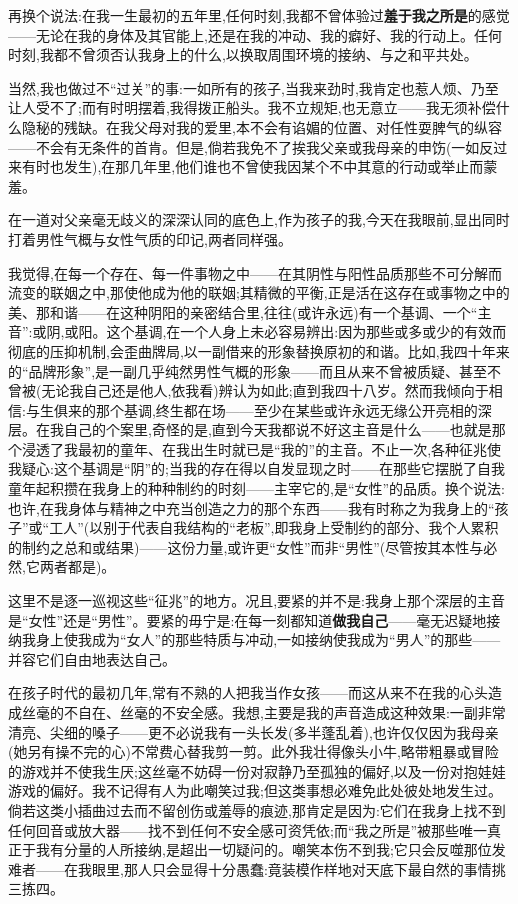 再换个说法:在我一生最初的五年里,任何时刻,我都不曾体验过\textbf{羞于我之所是}的感觉——无论在我的身体及其官能上,还是在我的冲动、我的癖好、我的行动上。任何时刻,我都不曾须否认我身上的什么,以换取周围环境的接纳、与之和平共处。

当然,我也做过不“过关”的事:一如所有的孩子,当我来劲时,我肯定也惹人烦、乃至让人受不了;而有时明摆着,我得拨正船头。我不立规矩,也无意立——我无须补偿什么隐秘的残缺。在我父母对我的爱里,本不会有谄媚的位置、对任性耍脾气的纵容——不会有无条件的首肯。但是,倘若我免不了挨我父亲或我母亲的申饬(一如反过来有时也发生),在那几年里,他们谁也不曾使我因某个不中其意的行动或举止而蒙羞。

在一道对父亲毫无歧义的深深认同的底色上,作为孩子的我,今天在我眼前,显出同时打着男性气概与女性气质的印记,两者同样强。

我觉得,在每一个存在、每一件事物之中——在其阴性与阳性品质那些不可分解而流变的联姻之中,那使他成为他的联姻;其精微的平衡,正是活在这存在或事物之中的美、那和谐——在这种阴阳的亲密结合里,往往(或许永远)有一个基调、一个“主音”:或阴,或阳。这个基调,在一个人身上未必容易辨出:因为那些或多或少的有效而彻底的压抑机制,会歪曲牌局,以一副借来的形象替换原初的和谐。比如,我四十年来的“品牌形象”,是一副几乎纯然男性气概的形象——而且从来不曾被质疑、甚至不曾被(无论我自己还是他人,依我看)辨认为如此;直到我四十八岁。然而我倾向于相信:与生俱来的那个基调,终生都在场——至少在某些或许永远无缘公开亮相的深层。在我自己的个案里,奇怪的是,直到今天我都说不好这主音是什么——也就是\dmark{}那个浸透了我最初的童年、在我出生时就已是“我的”的主音。不止一次,各种征兆使我疑心:这个基调是“阴”的;当我的存在得以自发显现之时——在那些它摆脱了自我童年起积攒在我身上的种种制约的时刻——主宰它的,是“女性”的品质。换个说法:也许,在我身体与精神之中充当创造之力的那个东西——我有时称之为我身上的“孩子”或“工人”(以别于代表自我结构的“老板”,即我身上受制约的部分、我个人累积的制约之总和或结果)——这份力量,或许更“女性”而非“男性”(尽管按其本性与必然,它两者都是)。

这里不是逐一巡视这些“征兆”的地方。况且,要紧的并不是:我身上那个深层的主音是“女性”还是“男性”。要紧的毋宁是:在每一刻都知道\textbf{做我自己}——毫无迟疑地接纳我身上使我成为“女人”的那些特质与冲动,一如接纳使我成为“男人”的那些——并容它们自由地表达自己。

在孩子时代的最初几年,常有不熟的人把我当作女孩——而这从来不在我的心头造成丝毫的不自在、丝毫的不安全感。我想,主要是我的声音造成这种效果:一副非常清亮、尖细的嗓子——更不必说我有一头长发(多半蓬乱着),也许仅仅因为我母亲(她另有操不完的心)不常费心替我剪一剪。此外我壮得像头小牛,略带粗暴或冒险的游戏并不使我生厌;这丝毫不妨碍一份对寂静乃至孤独的偏好,以及一份对抱娃娃游戏的偏好。我不记得有人为此嘲笑过我;但这类事想必难免此处彼处地发生过。倘若这类小插曲过去而不留创伤或羞辱的痕迹,那肯定是因为:它们在我身上找不到任何回音或放大器——找不到任何不安全感可资凭依;而“我之所是”被那些唯一真正于我有分量的人所接纳,是超出一切疑问的。嘲笑本伤不到我;它只会反噬那位发难者——在我眼里,那人只会显得十分愚蠢:竟装模作样地对天底下最自然的事情挑三拣四。


